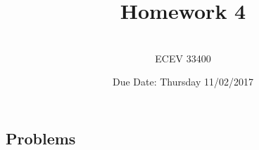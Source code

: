 \documentclass{article}
\begin{document}

\title{Homework 4} %
\author{ \\ECEV 33400} %
\date{Due Date: Thursday 11/02/2017} %

\maketitle

%
%

\subsection*{Problems} 
\end{document}

